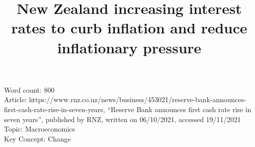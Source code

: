 \documentclass[a4paper,12pt]{article}
\title{New Zealand increasing interest rates to curb inflation and reduce inflationary pressure}
\author{}
\date{}
\newcommand{\comment}[1]{}
\begin{document}
\maketitle

Word count: 800\\
Article: https://www.rnz.co.nz/news/business/453021/reserve-bank-announces-first-cash-rate-rise-in-seven-years, ``Reserve Bank announces first cash rate rise in seven years'', published by RNZ, written on 06/10/2021, accessed 19/11/2021\\
Topic: Macroeconomics\\
Key Concept: Change

\newpage

\comment{
\section*{Article}

\textit{Reserve Bank announces first cash rate rise in seven years}

The Reserve Bank (RBNZ) has ignored the Covid-19 outbreak and raised the official cash rate (OCR) for the first time in seven years to head off growing inflation pressures.

It raised the OCR by a quarter of a percentage point to 0.5 percent, as expected, because of strongly rising prices, a hot housing market, and tight labour market.

The RBNZ's Monetary Policy Committee said the rise was justified even though the economy was likely to take a sharp hit from the current outbreak and lockdowns.

"The current COVID-19-related restrictions have not materially changed the medium-term outlook for inflation and employment since the August Statement."

It said household and business activity has been strong going into the shutdown and it was expected to rebound as it had previously.

"Ongoing fiscal policy support, and a strong terms of trade provide confidence that economic activity will recover quickly as alert level restrictions ease. Recent economic indicators support this picture," the committee said in a statement.

The RBNZ had been expected to raise rates in August, but decided at the last minute to keep rates unchanged because of the Covid uncertainty.

It acknowledged some businesses would be "badly affected" by the lockdowns but decided it needed to act to meet its target of maximum employment and inflation anchored around 2 percent.

}
\end{document}
